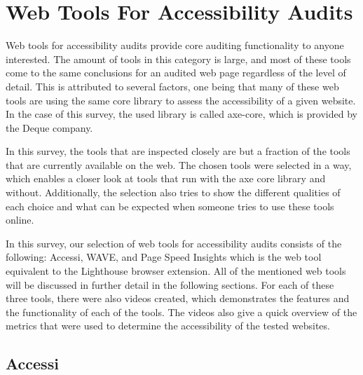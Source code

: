 %
%
% 
% 
% 


\chapter{Web Tools For Accessibility Audits}

\label{chap:WebTools}



Web tools for accessibility audits provide core auditing functionality to anyone interested. The amount of tools in this category is large, and most of these tools come to the same conclusions for an audited web page regardless of the level of detail. This is attributed to several factors, one being that many of these web tools are using the same core library to assess the accessibility of a given website. In the case of this survey, the used library is called axe-core, which is provided by the Deque company.

In this survey, the tools that are inspected closely are but a fraction of the tools that are currently available on the web. The chosen tools were selected in a way, which enables a closer look at tools that run with the axe core library and without. Additionally, the selection also tries to show the different qualities of each choice and what can be expected when someone tries to use these tools online.

In this survey, our selection of web tools for accessibility audits consists of the following: Accessi, WAVE, and Page Speed Insights which is the web tool equivalent to the Lighthouse browser extension. All of the mentioned web tools will be discussed in further detail in the following sections. For each of these three tools, there were also videos created, which demonstrates the features and the functionality of each of the tools. The videos also give a quick overview of the metrics that were used to determine the accessibility of the tested websites. 

\newpage

\section{Accessi}

